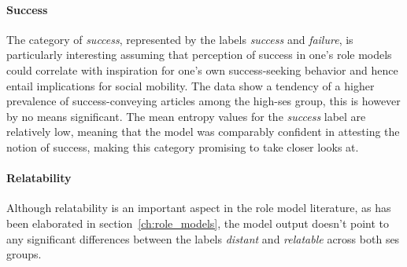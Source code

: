 \paragraph{Success}
The category of \textit{success}, represented by the labels \textit{success} and \textit{failure}, is particularly interesting assuming that perception of success in one's role models could correlate with inspiration for one's own success-seeking behavior and hence entail implications for social mobility. The data show a tendency of a higher prevalence of success-conveying articles among the high-\gls{ses} group, this is however by no means significant. The mean entropy values for the \textit{success} label are relatively low, meaning that the model was comparably confident in attesting the notion of success, making this category promising to take closer looks at.

\paragraph{Relatability}
Although relatability is an important aspect in the role model literature, as has been elaborated in section~\ref{ch:role_models}, the model output doesn't point to any significant differences between the labels \textit{distant} and \textit{relatable} across both \gls{ses} groups.

